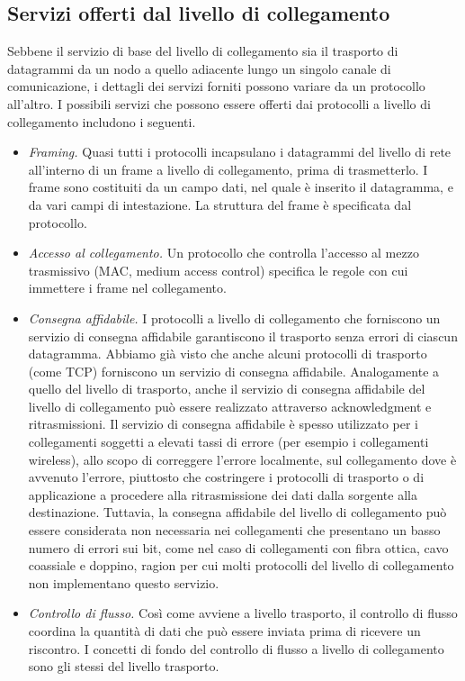 \subsection{Servizi offerti dal livello di collegamento}
Sebbene il servizio di base del livello di collegamento sia il trasporto di datagrammi
da un nodo a quello adiacente lungo un singolo canale di comunicazione, i dettagli
dei servizi forniti possono variare da un protocollo all’altro. I possibili servizi che
possono essere offerti dai protocolli a livello di collegamento includono i seguenti.
\begin{itemize}
    \item \textit{Framing.} Quasi tutti i protocolli incapsulano i datagrammi del livello di rete all’interno di un frame a livello di collegamento, prima di trasmetterlo. I frame sono costituiti da un campo dati, nel quale è inserito il datagramma, e da vari campi di intestazione. La struttura del frame è specificata dal protocollo.
    \item \textit{Accesso al collegamento.} Un protocollo che controlla l’accesso al mezzo trasmissivo (MAC, medium access control) specifica le regole con cui immettere i frame nel collegamento.
    \item \textit{Consegna affidabile.} I protocolli a livello di collegamento che forniscono un servizio di consegna affidabile garantiscono il trasporto senza errori di ciascun datagramma. Abbiamo già visto che anche alcuni protocolli di trasporto (come TCP) forniscono un servizio di consegna affidabile. Analogamente a quello del livello di trasporto, anche il servizio di consegna affidabile del livello di collegamento può essere realizzato attraverso acknowledgment e ritrasmissioni. Il servizio di consegna affidabile è spesso utilizzato per i collegamenti soggetti a elevati tassi di errore (per esempio i collegamenti wireless), allo scopo di correggere l’errore localmente, sul collegamento dove è avvenuto l’errore, piuttosto che costringere i protocolli di trasporto o di applicazione a procedere alla ritrasmissione dei dati dalla sorgente alla destinazione. Tuttavia, la consegna affidabile del livello di collegamento può essere considerata non necessaria nei collegamenti che presentano un basso numero di errori sui bit, come nel caso di collegamenti con fibra ottica, cavo coassiale e doppino, ragion per cui molti protocolli del livello di collegamento non implementano questo servizio.
    \item \textit{Controllo di flusso.} Così come avviene a livello trasporto, il controllo di flusso coordina la quantità di dati che può essere inviata prima di ricevere un riscontro. I concetti di fondo del controllo di flusso a livello di collegamento sono gli stessi del livello trasporto.

\end{itemize}
